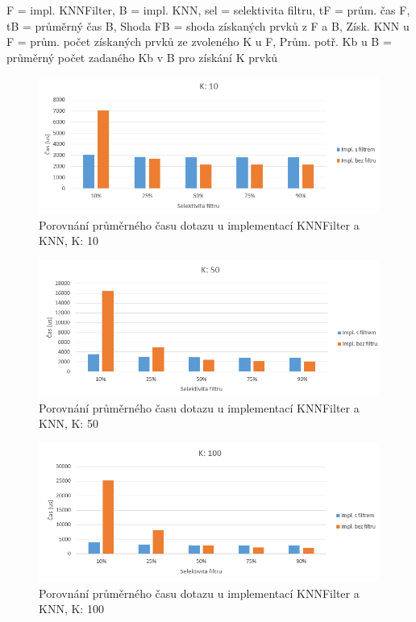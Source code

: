 \documentclass[czech,semestral,dept460,male,csharp,cpdeclaration]{diploma}
\begin{document}
\begin{center}
			{\footnotesize *F = impl. KNNFilter, B = impl. KNN, sel = selektivita filtru, tF = prům. čas F, tB = průměrný čas B, Shoda FB = shoda získaných prvků z F a B, Získ. KNN u F = prům. počet získaných prvků ze zvoleného K u F, Prům. potř. Kb u B = průměrný počet zadaného Kb v B pro získání K prvků}\\
			
			\label{FBC}
			
		\end{center}
		
		\label{graf_filtr_all}
		\begin{figure}
			\centering
			\includegraphics[scale=0.8]{Figures/graf_filtr_k10.png}
			\caption{Porovnání průměrného času dotazu u implementací KNNFilter a KNN, K: 10}
			\label{graf_filtr_k10}
		\end{figure}
	
		\begin{figure}
			\centering
			\includegraphics[scale=0.8]{Figures/graf_filtr_k50.png}
			\caption{Porovnání průměrného času dotazu u implementací KNNFilter a KNN, K: 50}
			\label{graf_filtr_k50}
		\end{figure}
	
		\begin{figure}
			\centering
			\includegraphics[scale=0.8]{Figures/graf_filtr_k100.png}
			\caption{Porovnání průměrného času dotazu u implementací KNNFilter a KNN, K: 100}
			\label{graf_filtr_k100}
		\end{figure}
	
\end{document}
